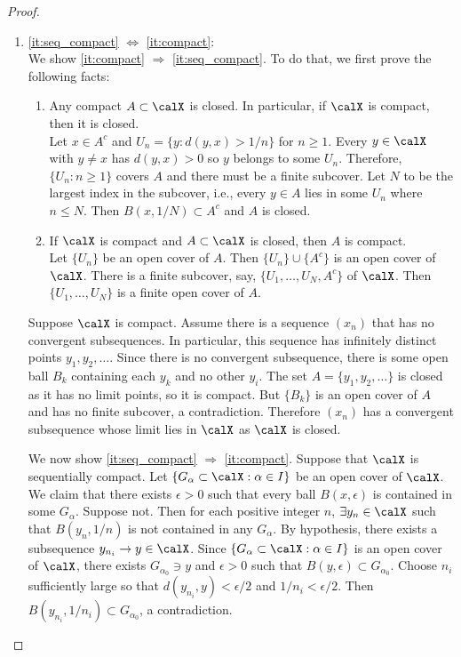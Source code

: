 \documentclass[../aipt.tex]{subfiles}
\begin{document}
\begin{proof}
\begin{enumerate}[1)]
\item \ref{it:seq_compact} $\Leftrightarrow$ \ref{it:compact}:\\
We show \ref{it:compact} $\Rightarrow$ \ref{it:seq_compact}. To do that, we first prove the following facts:
\begin{enumerate}
	\item Any compact $A \subset \calX$ is closed. In particular, if $\calX$ is compact, then it is closed.\\
	Let $x\in A^c$ and $U_n = \{y : d(y,x) > 1/n\}$ for $n\geq 1$. Every $y\in\calX$ with $y\ne x$ has $d(y,x)>0$ so $y$ belongs to some $U_n$. Therefore, $\{U_n : n\geq 1\}$ covers $A$ and there must be a finite subcover. Let $N$ to be the largest index in the subcover, i.e., every $y\in A$ lies in some $U_n$ where $n\leq N$. Then $B(x,1/N) \subset A^c$ and $A$ is closed.
	\item If $\calX$ is compact and $A\subset\calX$ is closed, then $A$ is compact.\\
	Let $\{U_n\}$ be an open cover of $A$. Then $\{U_n\}\cup\{ A^c\}$ is an open cover of $\calX$. There is a finite subcover, say, $\{U_1,\ldots,U_N,A^c\}$ of $\calX$. Then $\{U_1,\ldots,U_N\}$ is a finite open cover of $A$.
\end{enumerate}
Suppose $\calX$ is compact. Assume there is a sequence $(x_n)$ that has no convergent subsequences. In particular, this sequence has infinitely distinct points $y_1, y_2, \ldots$. Since there is no convergent subsequence, there is some open ball $B_k$ containing each $y_k$ and no other $y_i$. The set $A=\{y_1,y_2,\ldots\}$ is closed as it has no limit points, so it is compact. But $\{B_k\}$ is an open cover of $A$ and has no finite subcover, a contradiction. Therefore $(x_n)$ has a convergent subsequence whose limit lies in $\calX$ as $\calX$ is closed.

We now show \ref{it:seq_compact} $\Rightarrow$ \ref{it:compact}. Suppose that $\calX$ is sequentially compact. Let $\{G_\alpha\subset \calX : \alpha \in I\}$ be an open cover of $\calX$. We claim that there exists $\epsilon > 0 $ such that every ball $B(x,\epsilon)$ is contained in some $G_\alpha$. Suppose not. Then for each positive integer $n$, $\exists y_n\in\calX$ such that $B(y_n,1/n)$ is not contained in any $G_\alpha$. By hypothesis, there exists a subsequence $y_{n_i} \to y \in\calX$. Since $\{G_\alpha\subset \calX : \alpha \in I\}$ is an open cover of $\calX$, there exists $G_{\alpha_0} \ni y$ and $\epsilon>0$ such that $B(y,\epsilon) \subset G_{\alpha_0}$. Choose $n_i$ sufficiently large so that $d(y_{n_i},y) < \epsilon/2$ and $1/n_i<\epsilon/2$. Then $B(y_{n_i},1/n_i)\subset G_{\alpha_0}$, a contradiction.


\end{enumerate}
\end{proof}
\end{document}
